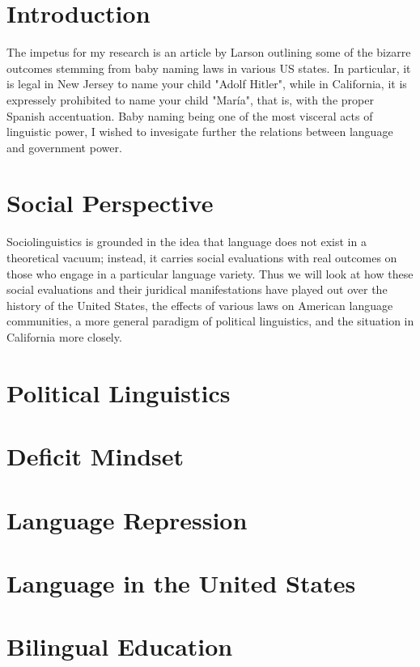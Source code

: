 \documentclass{article}
\begin{document}
\section*{Introduction}

The impetus for my research is an article by Larson outlining some of the
bizarre outcomes stemming from baby naming laws in various US states. In
particular, it is legal in New Jersey to name your child "Adolf Hitler", while
in California, it is expressely prohibited to name your child "María", that is,
with the proper Spanish accentuation. Baby naming being one of the most visceral
acts of linguistic power, I wished to invesigate further the relations between
language and government power.

\section*{Social Perspective}

Sociolinguistics is grounded in the idea that language does not exist in a
theoretical vacuum; instead, it carries social evaluations with real outcomes on
those who engage in a particular language variety. Thus we will look at how
these social evaluations and their juridical manifestations have played out over
the history of the United States, the effects of various laws on American
language communities, a more general paradigm of political linguistics, and the
situation in California more closely.

\section*{Political Linguistics}

\section*{Deficit Mindset}

\section*{Language Repression}

\section*{Language in the United States}

\section*{Bilingual Education}
\end{document}
